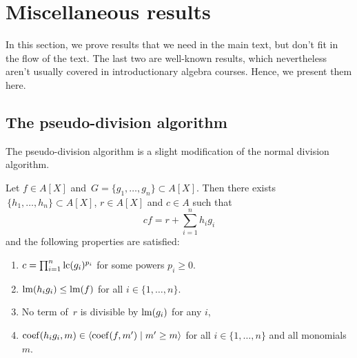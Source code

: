\section{Miscellaneous results}
In this section, we prove results that we need in the main text, but don't fit in the flow of the text. The last two are well-known results, which nevertheless aren't usually covered in introductionary algebra courses. Hence, we present them here.

\subsection{The pseudo-division algorithm}\label{app:pseudo}
The pseudo-division algorithm is a slight modification of the normal division algorithm.

\begin{theorem}
  Let $f \in A[X]$ and $\,G = \{g_{1}, \dots, g_{n}\} \subset A[X]$. Then there exists $\,\{h_{1}, \dots, h_{n}\} \subset A[X]$, $r \in A[X]$ and $c \in A$ such that
  \[c f = r + \sum_{i=1}^{n} h_{i} g_{i}\]
  and the following properties are satisfied:
  \begin{enumerate}
    \item $c = \prod_{i=1}^{n} \operatorname{lc}(g_{i})^{p_{i}}$ for some powers $p_{i} \geq 0$.
    \item $\operatorname{lm}(h_{i} g_{i}) \leq \operatorname{lm}(f)$ for all $i \in \{1, \dots, n\}$.
    \item No term of $\,r$ is divisible by $\operatorname{lm}(g_{i})$ for any $i$,
    \item $\operatorname{coef}(h_{i} g_{i}, m) \in \langle \operatorname{coef}(f, m') \mid m' \geq m \rangle$ for all $i \in \{1, \dots, n\}$ and all monomials $m$.
  \end{enumerate}
\end{theorem}
